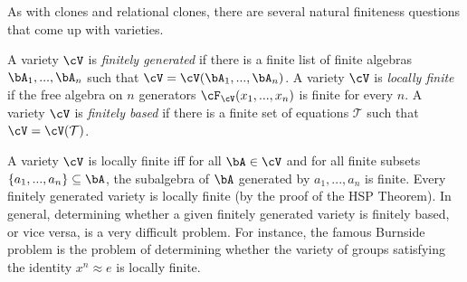 As with clones and relational clones, there are several natural finiteness questions that come up with varieties.

\begin{defn} A variety $\cV$ is \emph{finitely generated} if there is a finite list of finite algebras $\bA_1, ..., \bA_n$ such that $\cV = \cV(\bA_1, ..., \bA_n)$. A variety $\cV$ is \emph{locally finite} if the free algebra on $n$ generators $\cF_{\cV}(x_1, ..., x_n)$ is finite for every $n$. A variety $\cV$ is \emph{finitely based} if there is a finite set of equations $\mathcal{T}$ such that $\cV = \cV(\mathcal{T})$.
\end{defn}

A variety $\cV$ is locally finite iff for all $\bA \in \cV$ and for all finite subsets $\{a_1, ..., a_n\} \subseteq \bA$, the subalgebra of $\bA$ generated by $a_1, ..., a_n$ is finite. Every finitely generated variety is locally finite (by the proof of the HSP Theorem). In general, determining whether a given finitely generated variety is finitely based, or vice versa, is a very difficult problem. For instance, the famous Burnside problem is the problem of determining whether the variety of groups satisfying the identity $x^n \approx e$ is locally finite.

